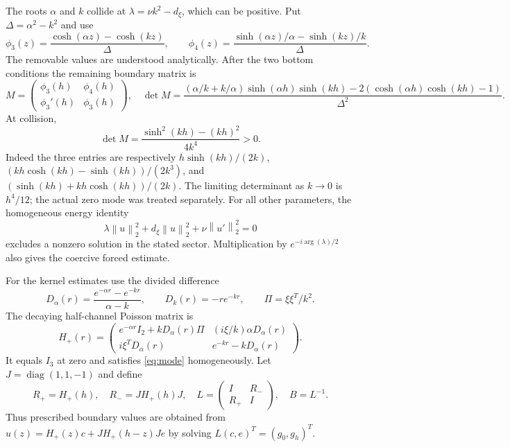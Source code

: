 \documentclass[11pt]{article}
\numberwithin{equation}{section}
\theoremstyle{remark}
\newcommand{\R}{\mathbb R}
\newcommand{\diag}{\operatorname{diag}}
\newcommand{\norm}[1]{\left\lVert#1\right\rVert}
\DeclareMathOperator{\argu}{arg}
\begin{document}
The roots $\alpha$ and $k$ collide at $\lambda=\nu k^2-d_\xi$,
which can be positive. Put $\Delta=\alpha^2-k^2$ and use
\[
 \phi_3(z)=\frac{\cosh(\alpha z)-\cosh(kz)}{\Delta},\qquad
 \phi_4(z)=\frac{\sinh(\alpha z)/\alpha-\sinh(kz)/k}{\Delta}.
\]
The removable values are understood analytically. After the two bottom
conditions the remaining boundary matrix is
\[
 M=\begin{pmatrix}\phi_3(h)&\phi_4(h)\\
 \phi_3'(h)&\phi_3(h)\end{pmatrix},\quad
 \det M=\frac{(\alpha/k+k/\alpha)\sinh(\alpha h)\sinh(kh)
 -2(\cosh(\alpha h)\cosh(kh)-1)}{\Delta^2}.
\]
At collision,
\begin{equation}\label{eq:confluent}
 \det M=\frac{\sinh^2(kh)-(kh)^2}{4k^4}>0.
\end{equation}
Indeed the three entries are respectively
$h\sinh(kh)/(2k)$,
$(kh\cosh(kh)-\sinh(kh))/(2k^3)$, and
$(\sinh(kh)+kh\cosh(kh))/(2k)$. The limiting determinant as
$k\to0$ is $h^4/12$; the actual zero mode was treated separately.
For all other parameters, the homogeneous energy identity
\[
 \lambda\norm{u}_2^2+d_\xi\norm{u}_2^2+\nu\norm{u'}_2^2=0
\]
excludes a nonzero solution in the stated sector. Multiplication by
$e^{-i\argu(\lambda)/2}$ also gives the coercive forced estimate.

For the kernel estimates use the divided difference
\[
 D_\alpha(r)=\frac{e^{-\alpha r}-e^{-kr}}{\alpha-k},\qquad
 D_k(r)=-r e^{-kr},\qquad \Pi=\xi\xi^T/k^2.
\]
The decaying half-channel Poisson matrix is
\begin{equation}\label{eq:poisson}
 H_+(r)=\begin{pmatrix}
 e^{-\alpha r}I_2+kD_\alpha(r)\Pi&(i\xi/k)\alpha D_\alpha(r)\\
 i\xi^TD_\alpha(r)&e^{-kr}-kD_\alpha(r)
 \end{pmatrix}.
\end{equation}
It equals $I_3$ at zero and satisfies \eqref{eq:mode} homogeneously.
Let $J=\diag(1,1,-1)$ and define
\[
 R_+=H_+(h),\quad R_-=JH_+(h)J,\quad
 L=\begin{pmatrix}I&R_-\\R_+&I\end{pmatrix},\quad B=L^{-1}.
\]
Thus prescribed boundary values are obtained from
$u(z)=H_+(z)c+JH_+(h-z)Je$ by solving $L(c,e)^T=(g_0,g_h)^T$.
\end{document}

